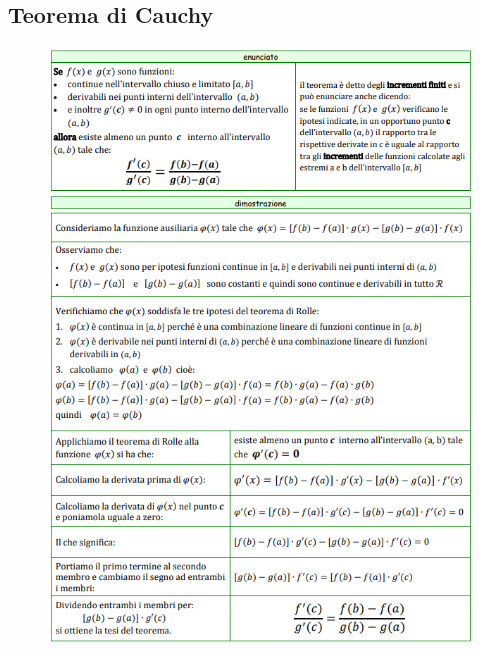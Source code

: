\documentclass[a4paper, 9pt]{report}
\begin{document}
\subsection*{Teorema di Cauchy}
\begin{figure}[h!]
    \includegraphics[width=\linewidth]{../dim/cauchy.PNG}
\end{figure}
\newpage
\end{document}
